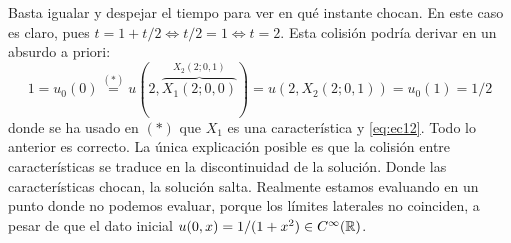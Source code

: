 \begin{ejemplo}
\begin{figure}[H]
\begin{center}
        \end{center}
    \end{figure}
    Basta igualar y despejar el tiempo para ver en qué instante chocan. En este caso es claro, pues $t = 1 + t/2 \iff t/2 = 1 \iff t = 2$.
    Esta colisión podría derivar en un absurdo a priori:
    $$1 = u_0(0) \stackrel{(*)}{=} u(2,\overbrace{X_1(2;0,0)}^{X_2(2;0,1)}) = u(2,X_2(2;0,1)) = u_0(1) = 1/2$$
    donde se ha usado en $(*)$ que $X_1$ es una característica y \eqref{eq:ec12}. Todo lo anterior es correcto. La única explicación posible es que 
    la colisión entre características se traduce en la discontinuidad de la solución. Donde las características chocan, la solución salta. Realmente 
    estamos evaluando en un punto donde no podemos evaluar, porque los límites laterales no coinciden, a pesar de que el dato inicial $u(0,x) = 1/(1+x^2) \in C^\infty(\mathbb{R})$.
\end{ejemplo}

